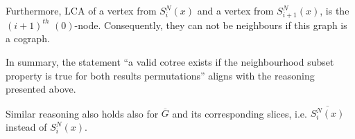 Furthermore, LCA of a vertex from $S^N_i(x)$ and a vertex from $S^N_{i+1}(x)$, is the $(i+1)^{th}$ $(0)$-node. Consequently, they can not be neighbours if this graph is a cograph.

In summary, the statement ``a valid cotree exists if the neighbourhood subset property is true for both results permutations'' aligns with the reasoning presented above. 

Similar reasoning also holds also for $\overline{G}$ and its corresponding slices, i.e. $\overline{S^N_i(x)}$ instead of $S^N_i(x)$.
